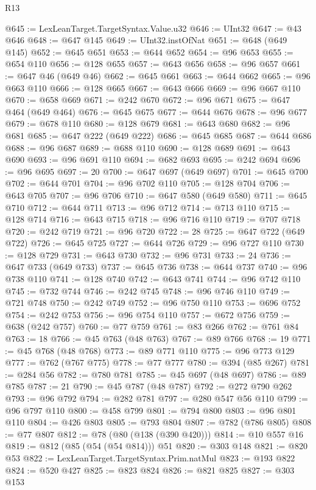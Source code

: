 \begin{lexlean}{R13}
\begin{coremodule}
{{{{{{{{{{{{{{{{{{{{{{{{{{{{{{{{{{{{{{{{{{{{{{{{{{{{{{{{{{{{{{{{{{{{{{{{{{{{{{{{{{{{{{{{{{{{{{{{{{{{{{{{{{@645 := LexLeanTarget.TargetSyntax.Value.u32
@646 := UInt32
@647 := @43 @646
@648 := @647 @145
@649 := UInt32.instOfNat
@651 := @648 (@649 @145)
@652 := @645 @651
@653 := @644 @652
@654 := @96 @653
@655 := @654 @110
@656 := @128 @655
@657 := @643 @656
@658 := @96 @657
@661 := @647 @46 (@649 @46)
@662 := @645 @661
@663 := @644 @662
@665 := @96 @663 @110
@666 := @128 @665
@667 := @643 @666
@669 := @96 @667 @110
@670 := @658 @669
@671 := @242 @670
@672 := @96 @671
@675 := @647 @464 (@649 @464)
@676 := @645 @675
@677 := @644 @676
@678 := @96 @677
@679 := @678 @110
@680 := @128 @679
@681 := @643 @680
@682 := @96 @681
@685 := @647 @222 (@649 @222)
@686 := @645 @685
@687 := @644 @686
@688 := @96 @687
@689 := @688 @110
@690 := @128 @689
@691 := @643 @690
@693 := @96 @691 @110
@694 := @682 @693
@695 := @242 @694
@696 := @96 @695
@697 := 20
@700 := @647 @697 (@649 @697)
@701 := @645 @700
@702 := @644 @701
@704 := @96 @702 @110
@705 := @128 @704
@706 := @643 @705
@707 := @96 @706
@710 := @647 @580 (@649 @580)
@711 := @645 @710
@712 := @644 @711
@713 := @96 @712
@714 := @713 @110
@715 := @128 @714
@716 := @643 @715
@718 := @96 @716 @110
@719 := @707 @718
@720 := @242 @719
@721 := @96 @720
@722 := 28
@725 := @647 @722 (@649 @722)
@726 := @645 @725
@727 := @644 @726
@729 := @96 @727 @110
@730 := @128 @729
@731 := @643 @730
@732 := @96 @731
@733 := 24
@736 := @647 @733 (@649 @733)
@737 := @645 @736
@738 := @644 @737
@740 := @96 @738 @110
@741 := @128 @740
@742 := @643 @741
@744 := @96 @742 @110
@745 := @732 @744
@746 := @242 @745
@748 := @96 @746 @110
@749 := @721 @748
@750 := @242 @749
@752 := @96 @750 @110
@753 := @696 @752
@754 := @242 @753
@756 := @96 @754 @110
@757 := @672 @756
@759 := @638 (@242 @757)
@760 := @77 @759
@761 := @83 @266
@762 := @761 @84
@763 := 18
@766 := @45 @763 (@48 @763)
@767 := @89 @766
@768 := 19
@771 := @45 @768 (@48 @768)
@773 := @89 @771 @110
@775 := @96 @773 @129
@777 := @762 (@767 @775)
@778 := @77 @777
@780 := @394 (@85 @267)
@781 := @284 @56
@782 := @780 @781
@785 := @45 @697 (@48 @697)
@786 := @89 @785
@787 := 21
@790 := @45 @787 (@48 @787)
@792 := @272 @790 @262
@793 := @96 @792
@794 := @282 @781
@797 := @280 @547 @56 @110
@799 := @96 @797 @110
@800 := @458 @799
@801 := @794 @800
@803 := @96 @801 @110
@804 := @426 @803
@805 := @793 @804
@807 := @782 (@786 @805)
@808 := @77 @807
@812 := @78 (@80 (@138 (@390 @420)))
@814 := @10 @557 @16
@819 := @812 (@85 (@54 (@54 @814))) @51
@820 := @303 @148
@821 := @820 @53
@822 := LexLeanTarget.TargetSyntax.Prim.natMul
@823 := @193 @822
@824 := @520 @427
@825 := @823 @824
@826 := @821 @825
@827 := @303 @153
}}}}}}}}}}}}}}}}}}}}}}}}}}}}}}}}}}}}}}}}}}}}}}}}}}}}}}}}}}}}}}}}}}}}}}}}}}}}}}}}}}}}}}}}}}}}}}}}}}}}}}}}}}
\end{coremodule}
\end{lexlean}
